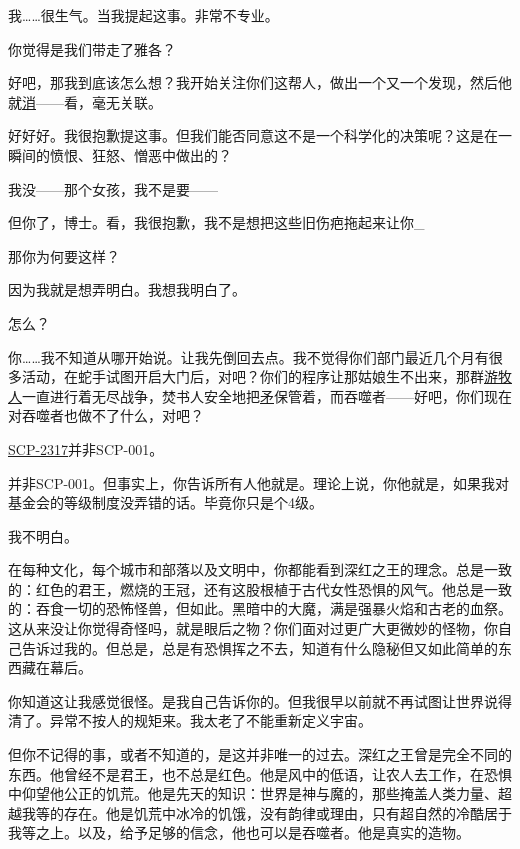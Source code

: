 \begin{scpbox}
我……很生气。当我提起这事。非常不专业。

你觉得是我们带走了雅各？

好吧，那我到底该怎么想？我开始关注你们这帮人，做出一个又一个发现，然后他就\hyperref[chap:]{消}——看，毫无关联。

好好好。我很抱歉提这事。但我们能否同意这不是一个科学化的决策呢？这是在一瞬间的愤恨、狂怒、憎恶中做出的？

我没——那个女孩，我不是要——

但你了，博士。看，我很抱歉，我不是想把这些旧伤疤拖起来让你_

那你为何要这样？

因为我就是想弄明白。我想我明白了。

怎么？

你……我不知道从哪开始说。让我先倒回去点。我不觉得你们部门最近几个月有很多活动，在蛇手试图开启大门后，对吧？你们的程序让那姑娘生不出来，那群\hyperref[chap:SCP-3838]{游牧人}一直进行着无尽战争，焚书人安全地把\hyperref[chap:]{矛}保管着，而吞噬者——好吧，你们现在对吞噬者也做不了什么，对吧？

\hyperref[chap:SCP-2317]{SCP-2317}并非SCP-001。

并非SCP-001。但事实上，你告诉所有人他就是。理论上说，你他就是，如果我对基金会的等级制度没弄错的话。毕竟你只是个4级。

我不明白。

在每种文化，每个城市和部落以及文明中，你都能看到深红之王的理念。总是一致的：红色的君王，燃烧的王冠，还有这股根植于古代女性恐惧的风气。他总是一致的：吞食一切的恐怖怪兽，但如此。黑暗中的大魔，满是强暴火焰和古老的血祭。这从来没让你觉得奇怪吗，就是眼后之物？你们面对过更广大更微妙的怪物，你自己告诉过我的。但总是，总是有恐惧挥之不去，知道有什么隐秘但又如此简单的东西藏在幕后。

你知道这让我感觉很怪。是我自己告诉你的。但我很早以前就不再试图让世界说得清了。异常不按人的规矩来。我太老了不能重新定义宇宙。

但你不记得的事，或者不知道的，是这并非唯一的过去。深红之王曾是完全不同的东西。他曾经不是君王，也不总是红色。他是风中的低语，让农人去工作，在恐惧中仰望他公正的饥荒。他是先天的知识：世界是神与魔的，那些掩盖人类力量、超越我等的存在。他是饥荒中冰冷的饥饿，没有韵律或理由，只有超自然的冷酷居于我等之上。以及，给予足够的信念，他也可以是吞噬者。他是真实的造物。


\end{scpbox}
